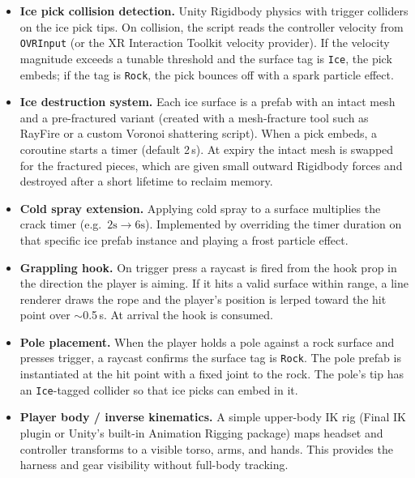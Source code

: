 \documentclass[12pt]{article}
\begin{document}
\begin{itemize}[leftmargin=2em]
    \item \textbf{Ice pick collision detection.} Unity Rigidbody physics with trigger colliders on the ice pick tips. On collision, the script reads the controller velocity from \texttt{OVRInput} (or the XR Interaction Toolkit velocity provider). If the velocity magnitude exceeds a tunable threshold and the surface tag is \texttt{Ice}, the pick embeds; if the tag is \texttt{Rock}, the pick bounces off with a spark particle effect.

    \item \textbf{Ice destruction system.} Each ice surface is a prefab with an intact mesh and a pre-fractured variant (created with a mesh-fracture tool such as RayFire or a custom Voronoi shattering script). When a pick embeds, a coroutine starts a timer (default 2\,s). At expiry the intact mesh is swapped for the fractured pieces, which are given small outward Rigidbody forces and destroyed after a short lifetime to reclaim memory.

    \item \textbf{Cold spray extension.} Applying cold spray to a surface multiplies the crack timer (e.g.\ $2\text{s} \rightarrow 6\text{s}$). Implemented by overriding the timer duration on that specific ice prefab instance and playing a frost particle effect.

    \item \textbf{Grappling hook.} On trigger press a raycast is fired from the hook prop in the direction the player is aiming. If it hits a valid surface within range, a line renderer draws the rope and the player's position is lerped toward the hit point over $\sim$0.5\,s. At arrival the hook is consumed.

    \item \textbf{Pole placement.} When the player holds a pole against a rock surface and presses trigger, a raycast confirms the surface tag is \texttt{Rock}. The pole prefab is instantiated at the hit point with a fixed joint to the rock. The pole's tip has an \texttt{Ice}-tagged collider so that ice picks can embed in it.

    \item \textbf{Player body / inverse kinematics.} A simple upper-body IK rig (Final IK plugin or Unity's built-in Animation Rigging package) maps headset and controller transforms to a visible torso, arms, and hands. This provides the harness and gear visibility without full-body tracking.


\end{itemize}
\end{document}

